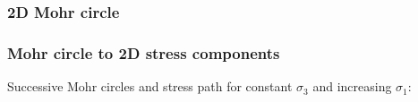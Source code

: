 \documentclass[notes]{beamer}
\begin{document}
\begin{frame}
\frametitle{2D Mohr circle}
\end{frame}

\begin{frame}
\frametitle{Mohr circle to 2D stress components}
Successive Mohr circles and stress path for constant $\sigma_3$ and increasing $\sigma_1$:
\end{frame}
\end{document}
